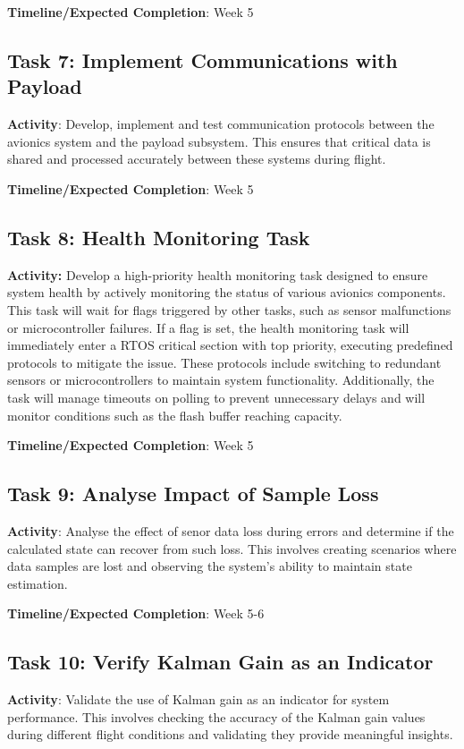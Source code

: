 \textbf{Timeline/Expected Completion}: Week 5

\subsection{Task 7: Implement Communications with Payload}
\textbf{Activity}: Develop, implement and test communication protocols between the avionics system and the payload subsystem. This ensures that critical data is shared and processed accurately between these systems during flight. 

\textbf{Timeline/Expected Completion}: Week 5

\subsection{Task 8: Health Monitoring Task}
\textbf{Activity:} Develop a high-priority health monitoring task designed to ensure system health by actively monitoring the status of various avionics components. This task will wait for flags triggered by other tasks, such as sensor malfunctions or microcontroller failures. If a flag is set, the health monitoring task will immediately enter a RTOS critical section with top priority, executing predefined protocols to mitigate the issue. These protocols include switching to redundant sensors or microcontrollers to maintain system functionality. Additionally, the task will manage timeouts on polling to prevent unnecessary delays and will monitor conditions such as the flash buffer reaching capacity. 

\textbf{Timeline/Expected Completion}: Week 5

\subsection{Task 9: Analyse Impact of Sample Loss}
\textbf{Activity}: Analyse the effect of senor data loss during errors and determine if the calculated state can recover from such loss. This involves creating scenarios where data samples are lost and observing the system's ability to maintain state estimation. 

\textbf{Timeline/Expected Completion}: Week 5-6

\subsection{Task 10: Verify Kalman Gain as an Indicator}
\textbf{Activity}: Validate the use of Kalman gain as an indicator for system performance. This involves checking the accuracy of the Kalman gain values during different flight conditions and validating they provide meaningful insights. 

